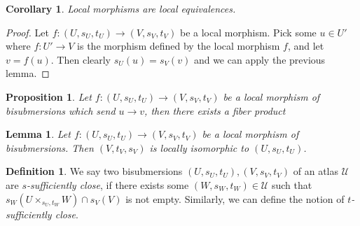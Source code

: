\documentclass[12pt]{amsart}
\newtheorem{cor}[thm]{Corollary}
\newtheorem{lem}[thm]{Lemma}
\newtheorem{prop}[thm]{Proposition}
\theoremstyle{definition}
\newtheorem{defn}[thm]{Definition}
\theoremstyle{remark}
\numberwithin{equation}{section}
\newcommand{\1}{{\mathbb{1}}}
\begin{document}
\begin{cor}
Local morphisms are local equivalences.
\end{cor}
\begin{proof}
Let $f:(U,s_U, t_U) \to (V, s_V, t_V)$ be a local morphism. Pick some $u\in U'$ where $f:U'\to V$ is the morphism defined by the local morphism $f$, and let $v = f(u)$. Then clearly $s_U(u) = s_V(v)$ and we can apply the previous lemma. 
\end{proof}

\begin{prop}
    Let $f: (U, s_U, t_U) \to (V, s_V, t_V)$ be a local morphism of bisubmersions which send $u \to v$, then there exists a fiber product
\end{prop}

\begin{lem}
    Let $f: (U, s_U, t_U) \to (V, s_V, t_V)$ be a local morphism of bisubmersions. Then $(V, t_V, s_V)$ is locally isomorphic to $(U, s_U, t_U)$.
\end{lem}


\begin{defn}
    We say two bisubmersions $(U, s_U, t_U), (V, s_V, t_V)$ of an atlas $\mathcal{U}$ are {\it $s$-sufficiently close}, if there exists some  $(W, s_W, t_W)\in \mathcal{U}$ such that $s_W(U\times_{s_U, t_W} W) \cap s_V(V)$ is not empty. Similarly, we can define the notion of {\it $t$-sufficiently close}.
\end{defn}
\end{document}
